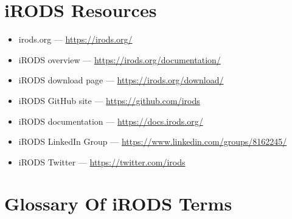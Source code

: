 \documentclass[10pt,oneside]{memoir}
\begin{document}
\appendix

\chapter{iRODS Resources}

\begin{itemize}
 \item irods.org --- \url{https://irods.org/}
 \item iRODS overview  --- \url{https://irods.org/documentation/}
 \item iRODS download page  --- \url{https://irods.org/download/}
 \item iRODS GitHub site ---  \url{https://github.com/irods}
 \item iRODS documentation --- \url{https://docs.irods.org/}
 \item iRODS LinkedIn Group --- \url{https://www.linkedin.com/groups/8162245/}
 \item iRODS Twitter --- \url{https://twitter.com/irods}
\end{itemize}




\chapter{Glossary Of iRODS Terms}
\end{document}
